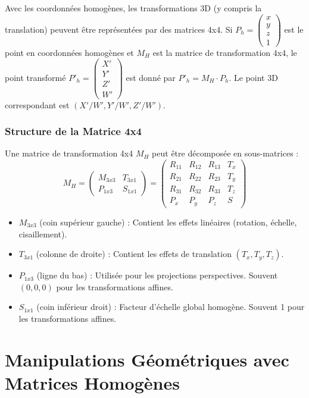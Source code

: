 \documentclass{article}
\begin{document}
Avec les coordonnées homogènes, les transformations 3D (y compris la translation) peuvent être représentées par des matrices 4x4.
Si $P_h = \begin{pmatrix} x \\ y \\ z \\ 1 \end{pmatrix}$ est le point en coordonnées homogènes et $M_H$ est la matrice de transformation 4x4, le point transformé $P'_h = \begin{pmatrix} X' \\ Y' \\ Z' \\ W' \end{pmatrix}$ est donné par $P'_h = M_H \cdot P_h$. Le point 3D correspondant est $(X'/W', Y'/W', Z'/W')$.

\subsubsection{Structure de la Matrice 4x4}
Une matrice de transformation 4x4 $M_H$ peut être décomposée en sous-matrices :
\[ M_H = \begin{pmatrix}
M_{3x3} & T_{3x1} \\
P_{1x3} & S_{1x1}
\end{pmatrix} =
\begin{pmatrix}
R_{11} & R_{12} & R_{13} & T_x \\
R_{21} & R_{22} & R_{23} & T_y \\
R_{31} & R_{32} & R_{33} & T_z \\
P_x & P_y & P_z & S
\end{pmatrix}
\]
\begin{itemize}
    \item $M_{3x3}$ (coin supérieur gauche) : Contient les effets linéaires (rotation, échelle, cisaillement).
    \item $T_{3x1}$ (colonne de droite) : Contient les effets de translation $(T_x, T_y, T_z)$.
    \item $P_{1x3}$ (ligne du bas) : Utilisée pour les projections perspectives. Souvent $(0, 0, 0)$ pour les transformations affines.
    \item $S_{1x1}$ (coin inférieur droit) : Facteur d'échelle global homogène. Souvent 1 pour les transformations affines.
\end{itemize}

\section{Manipulations Géométriques avec Matrices Homogènes}
\end{document}
